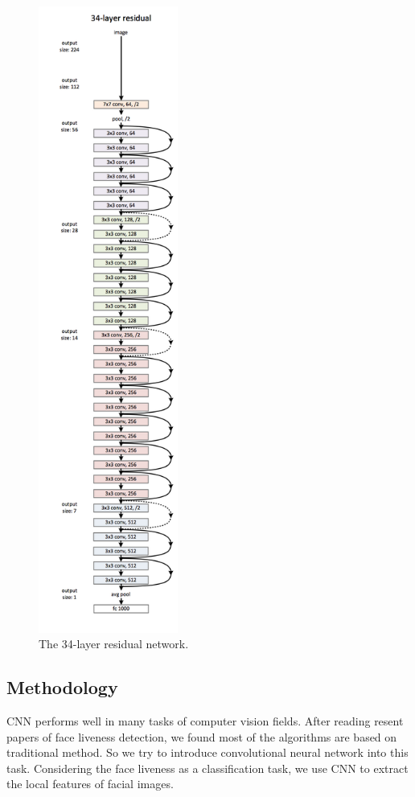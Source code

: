 \documentclass[journal]{IEEEtran}
\begin{document}
\begin{figure}[!htbp]
\centering
\includegraphics[width=1.8in]{img/Res34}
\caption{The 34-layer residual network.}
\label{fig_2_2}
\end{figure}

\subsection{Methodology}
CNN performs well in many tasks of computer vision fields. After reading resent papers of face liveness detection, we found most of the algorithms are based on traditional method. So we try to introduce convolutional neural network into this task. Considering the face liveness as a classification task, we use CNN to extract the local features of facial images.
\end{document}
